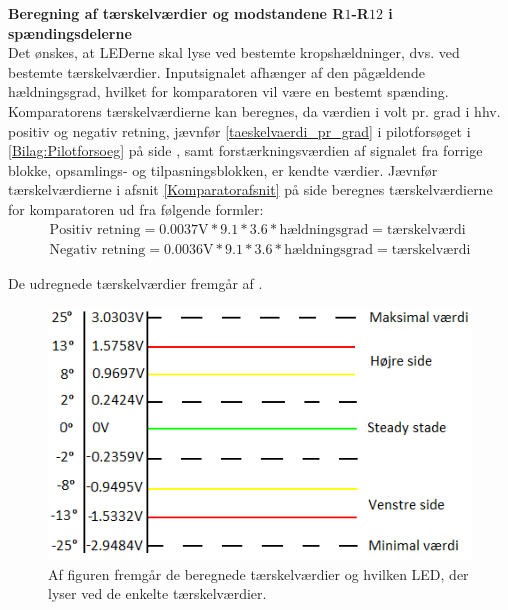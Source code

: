 \noindent\textbf{Beregning af tærskelværdier og modstandene R$1$-R$12$ i spændingsdelerne} \\
Det ønskes, at LEDerne skal lyse ved bestemte kropshældninger, dvs. ved bestemte tærskelværdier. Inputsignalet afhænger af den pågældende hældningsgrad, hvilket for komparatoren vil være en bestemt spænding. Komparatorens tærskelværdierne kan beregnes, da værdien i volt pr. grad i hhv. positiv og negativ retning, jævnfør \eqref{taeskelvaerdi_pr_grad} i pilotforsøget i \ref{Bilag:Pilotforsoeg} på side \pageref{Sec_Pilot_Data}, samt forstærkningsværdien af signalet fra forrige blokke, opsamlings- og tilpasningsblokken, er kendte værdier. Jævnfør tærskelværdierne i afsnit \ref{Komparatorafsnit} på side \pageref{Komparatorafsnit} beregnes tærskelværdierne for komparatoren ud fra følgende formler:
\begin{eqnarray} \label{pr_grad} 
\text{Positiv retning} = {0.0037\text{V}*9.1*3.6*\text{hældningsgrad}} = \text{tærskelværdi} \\
\text{Negativ retning} = {0.0036\text{V}*9.1*3.6*\text{hældningsgrad}} = \text{tærskelværdi}
\end{eqnarray}

De udregnede tærskelværdier fremgår af . 
\begin{figure}[H]
	\centering
	\includegraphics[scale=1.]{figures/cProblemloesning/Taerskelvaerdier.PNG}
	\caption{Af figuren fremgår de beregnede tærskelværdier og hvilken LED, der lyser ved de enkelte tærskelværdier.}
	\label{fig:taerskelvaerdier}
\end{figure}

